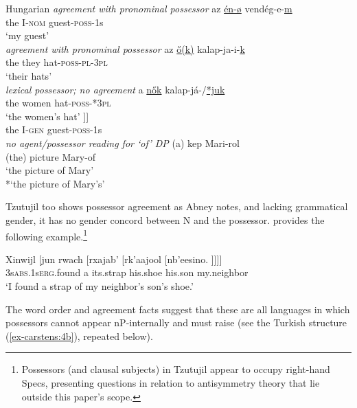 \documentclass[output=paper
,modfonts
,nonflat]{langsci/langscibook}
\begin{document}
\begin{exe}
	\ex Hungarian \citep[90]{Szabolcsi1983} \label{ex-carstens:16}
	\xlist
		\ex \label{ex-carstens:16a}\textit{agreement with pronominal possessor} \newline
	\gll az   \uline{én-ø} vendég-e-\uline{m}\\
	the I-\textsc{nom} guest-\textsc{poss}{}-1s\\
	\glt `my guest'  	
    \ex \citep[139]{Den_Dikken1999}\label{ex-carstens:16b}\\
        \textit{agreement with pronominal possessor} \newline
	\gll az   \uline{\H{o}(k)}  kalap-ja-i-\uline{k}\\
	the they hat-\textsc{poss}{}-\textsc{pl}{}-\textsc{3pl}\\
	\glt `their hats'
    \ex \citep[139]{Den_Dikken1999}\label{ex-carstens:16c}\\
        \textit{lexical possessor; no agreement}\newline
	\gll  a   \uline{n\H{o}k}       kalap-já-/\uline{*juk}\\
	the   women hat-\textsc{poss}{}-*\textsc{3pl}\\
	\glt `the women's hat' 
		\ex \label{ex-carstens:16d}
	\gll [\textsubscript{DP} az [\textsubscript{FP} én F\textsubscript{u}\textsubscript{$\phi$} [\textsubscript{\textit{n}P} <az> \textit{n} vendég-e-m ]]]\\
{}	the  {}{} I-\textsc{gen} {} {} {} {} guest-\textsc{poss}-1s\\
		\ex \label{ex-carstens:16e}\textit{no agent/possessor reading for `of' DP} \newline
	\gll (a) kep       Mari-rol\\
(the) picture Mary-of\\
	\glt `the picture of Mary'\\ {*}`the picture of Mary's'
	\endxlist
\end{exe}
Tzutujil too shows possessor agreement as Abney notes, and lacking grammatical gender, it has no gender concord between N and the possessor. \citet[286]{Dayley1985} provides the following example.\footnote{Possessors (and clausal subjects) in Tzutujil appear to occupy right-hand Specs, presenting questions in relation to antisymmetry theory \citep{Kayne1994} that lie outside this paper’s scope.}

\begin{exe}
	\ex 
	\gll Xinwijl [jun rwach [rxajab' [rk'aajool [nb'eesino. ]]]]\\
	3s\textsc{abs}.1s\textsc{erg}.found     \hspace{0.1cm}a     its.strap    \hspace{0.1cm}his.shoe      \hspace{0.1cm}his.son    \hspace{0.1cm}my.neighbor\\
	\glt `I found a strap of my neighbor's son's shoe.'  	
\end{exe}
The word order and agreement facts suggest that these are all languages in which possessors cannot appear nP-internally and must raise (see the Turkish structure (\ref{ex-carstens:4b}), repeated below).\largerpage[2]
\end{document}

